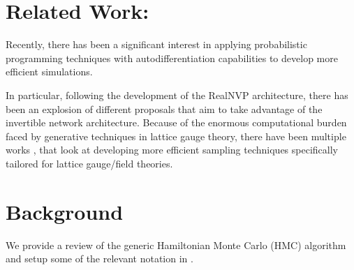 \documentclass{article} %
\begin{document}
\section{\label{sec:related_work}Related Work:}
Recently, there has been a significant interest in applying probabilistic programming techniques with
autodifferentiation capabilities to develop more efficient simulations.
%

%
In particular, following the development of the RealNVP \citep{dinhRealNVP} architecture, there has been an explosion of
different proposals that aim to take advantage of the invertible network architecture.
%
Because of the enormous computational burden faced by generative techniques in lattice gauge theory, there have been
multiple works
\citep{%
   albergo2019flow,albergo2021introduction,favoni2020lattice,medvidovic2020generative,neklyudov2020orbital,
   neklyudov2020involutive, li2020neural,boyda2020sampling,kanwar2020equivariant,toth2019hamiltonian,
   hoffman2019neutra,wehenkel2020you,pasarica2010adaptively, dinhRealNVP,tanaka2017towards,schaefer2009investigating,
   cossu2018testing,rezende2020normalizing%
},%
that look at developing more efficient sampling techniques specifically tailored for lattice gauge/field theories.
%
%
\section{\label{sec:background}Background}
We provide a review of the generic Hamiltonian Monte Carlo (HMC) algorithm and setup some of the relevant notation in
.
%
\end{document}
